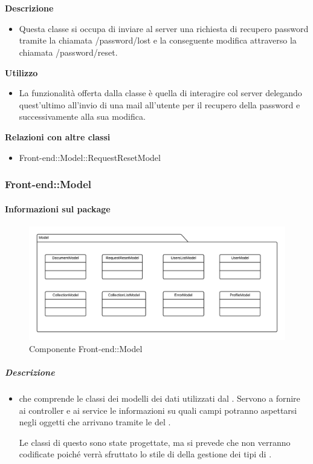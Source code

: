         \textbf{\\ \\ Descrizione} 
          \begin{itemize}
            \item[] Questa classe si occupa di inviare al server una richiesta di recupero password tramite la chiamata /password/lost e la conseguente modifica attraverso la chiamata /password/reset.
          \end{itemize}      
        \textbf{Utilizzo}  
          \begin{itemize}
            \item[] La  funzionalità offerta dalla classe è quella di interagire col server delegando quest'ultimo all'invio di una mail all'utente per il recupero della password e successivamente alla sua modifica.
          \end{itemize}
          \textbf{Relazioni con altre classi}
          \begin{itemize}
              \item{Front-end::Model::RequestResetModel}
          \end{itemize}
  \subsubsection{Front-end::Model}
  \paragraph{Informazioni sul package}
    \begin{figure}[H] 
      \begin{center} 
        \includegraphics[width=\textwidth]{packages/Front-end::Model.png}  
        \caption{Componente Front-end::Model}
      \end{center}  
    \end{figure} 
  \subparagraph{Descrizione} 
    \begin{itemize}
    \item[]  che comprende le classi dei modelli dei dati utilizzati dal . Servono a fornire ai controller e ai service le informazioni su quali campi potranno aspettarsi negli oggetti che arrivano tramite le  del .

Le classi di questo  sono state progettate, ma si prevede che non verranno codificate poiché verrà sfruttato lo stile di  della gestione dei tipi di .
    \end{itemize} 
